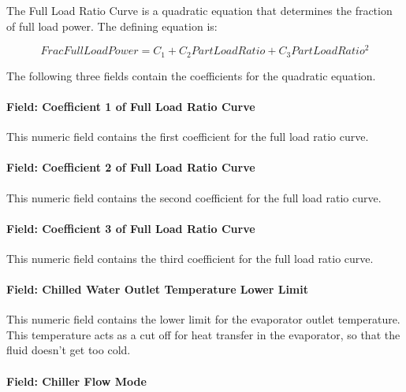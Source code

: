 The Full Load Ratio Curve is a quadratic equation that determines the fraction of full load power. The defining equation is:

\begin{equation}
    FracFullLoadPower = {C_1} + {C_2}PartLoadRatio + {C_3}PartLoadRati{o^2}
\end{equation}

The following three fields contain the coefficients for the quadratic equation.

\paragraph{Field: Coefficient 1 of Full Load Ratio Curve}\label{field-coefficient-1-of-full-load-ratio-curve}

This numeric field contains the first coefficient for the full load ratio curve.

\paragraph{Field: Coefficient 2 of Full Load Ratio Curve}\label{field-coefficient-2-of-full-load-ratio-curve}

This numeric field contains the second coefficient for the full load ratio curve.

\paragraph{Field: Coefficient 3 of Full Load Ratio Curve}\label{field-coefficient-3-of-full-load-ratio-curve}

This numeric field contains the third coefficient for the full load ratio curve.

\paragraph{Field: Chilled Water Outlet Temperature Lower Limit}\label{field-chilled-water-outlet-temperature-lower-limit-2}

This numeric field contains the lower limit for the evaporator outlet temperature. This temperature acts as a cut off for heat transfer in the evaporator, so that the fluid doesn't get too cold.

\paragraph{Field: Chiller Flow Mode}\label{field-chiller-flow-mode-3}

